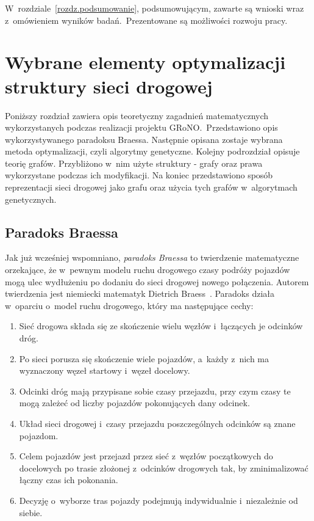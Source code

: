 \documentclass[twoside,12pt]{report}
\let\oldsection\chapter
\def\chapter{\cleardoublepage\oldsection}
\begin{document}
W~rozdziale~\ref{rozdz.podsumowanie}, podsumowującym, zawarte są wnioski wraz z~omówieniem wyników badań.~Prezentowane są możliwości rozwoju pracy. 

\chapter{Wybrane elementy optymalizacji struktury sieci drogowej}\label{rozdz.teoria} 
Poniższy rozdział zawiera opis teoretyczny zagadnień matematycznych wykorzystanych podczas realizacji projektu GRoNO.~Przedstawiono opis wykorzystywanego paradoksu Braessa. Następnie opisana zostaje wybrana metoda optymalizacji, czyli algorytmy genetyczne. Kolejny podrozdział opisuje teorię grafów. Przybliżono w~nim użyte struktury - grafy oraz prawa wykorzystane podczas ich modyfikacji. Na koniec przedstawiono sposób reprezentacji sieci drogowej jako grafu oraz użycia tych grafów w~algorytmach genetycznych.

\section{Paradoks Braessa}
Jak już wcześniej wspomniano, \textit{paradoks Braessa} to twierdzenie matematyczne orzekające, że w~pewnym modelu ruchu drogowego czasy podróży pojazdów mogą ulec wydłużeniu po dodaniu do sieci drogowej nowego połączenia. Autorem twierdzenia jest niemiecki matematyk Dietrich Braess~\cite{braess}. Paradoks działa w~oparciu o~model ruchu drogowego, który ma następujące cechy:

\begin{enumerate}
\item Sieć drogowa składa się ze skończenie wielu węzłów i~łączących je odcinków dróg.
\item Po sieci porusza się skończenie wiele pojazdów, a~każdy z~nich ma wyznaczony węzeł startowy i~węzeł docelowy.
\item Odcinki dróg mają przypisane sobie czasy przejazdu, przy czym czasy te mogą zależeć od liczby pojazdów pokonujących dany odcinek.
\item Układ sieci drogowej i~czasy przejazdu poszczególnych odcinków są znane pojazdom.
\item Celem pojazdów jest przejazd przez sieć z~węzłów początkowych do docelowych po trasie złożonej z~odcinków drogowych tak, by zminimalizować łączny czas ich pokonania.
\item Decyzję o~wyborze tras pojazdy podejmują indywidualnie i~niezależnie od siebie.
\end{enumerate}
\end{document}
